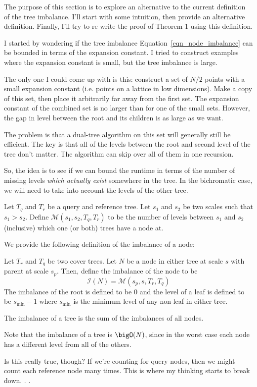
The purpose of this section is to explore an alternative to the current 
definition of the tree imbalance. I'll start with some intuition, then provide
an alternative definition. Finally, I'll try to re-write the proof of Theorem
1 using this definition. 


I started by wondering if the tree imbalance Equation~\ref{eqn_node_imbalance}
can be bounded in terms of the expansion constant. I tried to construct 
examples where the expansion constant is small, but the tree imbalance is 
large. 

The only one I could come up with is this: construct a set of $N/2$ points with
a small expansion constant (i.e. points on a lattice in low dimensions). Make a 
copy of this set, then place it arbitrarily far away from the first set.  The 
expansion constant of the combined set is no larger than for one of the small
sets. However, the gap in level between the root and its children is as 
large as we want. 

The problem is that a dual-tree algorithm on this set will generally still be 
efficient. The key is that all of the levels between the root and second level 
of the tree don't matter. The algorithm can skip over all of them in one 
recursion. 

So, the idea is to see if we can bound the runtime in terms of the number of 
missing levels \emph{which actually exist} somewhere in the tree. In the 
bichromatic case, we will need to take into account the levels of the other
tree. 

Let $T_q$ and $T_r$ be a query and reference tree. Let $s_1$ and $s_2$ be two 
scales such that $s_1 > s_2$. 
Define $\mathcal{M}(s_1, s_2, T_q, T_r)$ to be the number of levels between 
$s_1$ and $s_2$ (inclusive) which one (or both) trees have a node at. 

We provide the following definition of the imbalance of a node: 
\begin{definition}
  Let $T_r$ and $T_q$ be two cover trees. 
  Let $N$ be a node in either tree at scale $s$ with parent at scale $s_p$. 
  Then, define the imbalance of the node to be
  \begin{equation}
    \mathcal{I}(N) = \mathcal{M}(s_p, s, T_r, T_q)
  \end{equation}
  The imbalance of the root is defined to be $0$ and the level of a leaf is 
  defined to be $s_{\textrm{min}} - 1$ where $s_{\textrm{min}}$ is the minimum
  level of any non-leaf in either tree. 
  
  The imbalance of a tree is the sum of the imbalances of all nodes.
\end{definition}

Note that the imbalance of a tree is $\bigO(N)$, since in the worst case 
each node has a different level from all of the others. 

Is this really true, though? If we're counting for query nodes, then we might
count each reference node many times. This is where my thinking starts to break 
down. . . 








